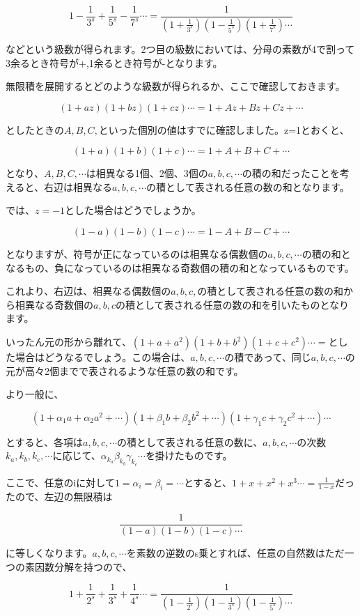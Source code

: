 \documentclass[./main]{subfiles}
\theoremstyle{break}
\begin{document}
\[1-\frac{1}{3^s}+\frac{1}{5^s}-\frac{1}{7^s}\cdots =\frac{1}{\left( 1+\frac{1}{3^s} \right)\left( 1-\frac{1}{5^s} \right)\left( 1+\frac{1}{7^s} \right)\cdots}\]

などという級数が得られます。2つ目の級数においては、分母の素数が4で割って3余るとき符号が+,1余るとき符号が-となります。

無限積を展開するとどのような級数が得られるか、ここで確認しておきます。

\[(1+az)(1+bz)(1+cz)\cdots=1+Az+Bz+Cz+\cdots\]

としたときの$A,B,C,$といった個別の値はすでに確認しました。z=1とおくと、

\[(1+a)(1+b)(1+c)\cdots=1+A+B+C+\cdots\]

となり、$A,B,C,\cdots$は相異なる1個、2個、3個の$a,b,c,\cdots$の積の和だったことを考えると、右辺は相異なる$a,b,c,\cdots$の積として表される任意の数の和となります。

では、$z=-1$とした場合はどうでしょうか。

\[(1-a)(1-b)(1-c)\cdots=1-A+B-C+\cdots\]

となりますが、符号が正になっているのは相異なる偶数個の$a,b,c,\cdots$の積の和となるもの、負になっているのは相異なる奇数個の積の和となっているものです。

これより、右辺は、相異なる偶数個の$a,b,c,$の積として表される任意の数の和から相異なる奇数個の$a,b,c$の積として表される任意の数の和を引いたものとなります。

いったん元の形から離れて、$(1+a+a^2)(1+b+b^2)(1+c+c^2)\cdots=$とした場合はどうなるでしょう。この場合は、$a,b,c,\cdots$の積であって、同じ$a,b,c,\cdots$の元が高々2個までで表されるような任意の数の和です。

より一般に、

\[(1+\alpha_1a+\alpha_2a^2+\cdots)(1+\beta_1b+\beta_2b^2+\cdots)(1+\gamma_1c+\gamma_2c^2+\cdots)\cdots\]

とすると、各項は$a,b,c,\cdots$の積として表される任意の数に、$a,b,c,\cdots$の次数$k_a,k_b,k_c,\cdots$に応じて、$\alpha_{k_a}\beta_{k_b}\gamma_{k_c}\cdots$を掛けたものです。

ここで、任意のiに対して$1=\alpha_i=\beta_i=\cdots$とすると、$1+x+x^2+x^3\cdots=\frac{1}{1-x}$だったので、左辺の無限積は

\[\frac{1}{(1-a)(1-b)(1-c)\cdots}\]

に等しくなります。$a,b,c,\cdots$を素数の逆数のs乗とすれば、任意の自然数はただ一つの素因数分解を持つので、

\[1+\frac{1}{2^s}+\frac{1}{3^s}+\frac{1}{4^s}\cdots =\frac{1}{\left( 1-\frac{1}{2^s} \right)\left( 1-\frac{1}{3^s} \right)\left( 1-\frac{1}{5^s} \right)\cdots}\]
\end{document}
